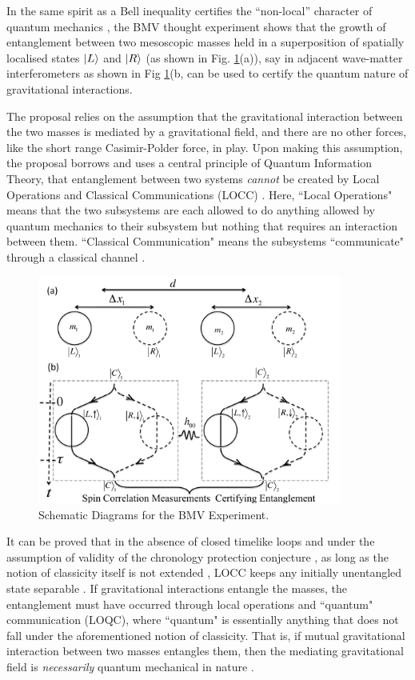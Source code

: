 \documentclass[12pt,a4paper]{report}
\theoremstyle{plain}
\theoremstyle{definition}
\theoremstyle{remark}
\DeclarePairedDelimiter\ket{\lvert}{\rangle}
\begin{document}
In the same spirit as a Bell inequality certifies the ``non-local'' character of quantum mechanics \cite{Bell}, the BMV thought experiment shows that the growth of entanglement between two mesoscopic masses held in a superposition  of spatially localised states $\ket{L}$ and $\ket{R}$ (as shown in Fig. \ref{fig:BMV}(a)\cite{Bose_2017}), say in adjacent wave-matter interferometers as shown in Fig \ref{fig:BMV}(b\cite{Bose_2017}, can be used to certify the quantum nature of gravitational interactions.

The proposal relies on the assumption that the gravitational interaction between the two masses is mediated by a gravitational field, and there are no other forces, like the short range Casimir-Polder force, in play. Upon making this assumption, the proposal borrows and uses a central principle of Quantum Information Theory, that entanglement between two systems \textit{cannot} be created by Local Operations and Classical Communications (LOCC) \cite{RevModPhys.81.865}. Here, ``Local Operations" means that the two subsystems are each allowed to do anything allowed by quantum mechanics to their subsystem but nothing that requires an interaction between them. ``Classical Communication" means the subsystems ``communicate" through a classical channel \cite{Bose_2017}. 

\begin{figure}[ht!]
    \centering
    \includegraphics[width=10cm]{LR_fig.pdf}
    \caption{Schematic Diagrams for the BMV Experiment.}
    \label{fig:BMV}
\end{figure}

It can be proved that in the absence of closed timelike loops \cite{timelike} and under the assumption of validity of the chronology protection conjecture \cite{PhysRevLett.68.267}, as long as the notion of classicity itself is not extended \cite{Hall_2018}, LOCC keeps any initially unentangled state separable \cite{Bose_2017}. If gravitational interactions entangle the masses, the entanglement must have occurred through local operations and ``quantum" communication (LOQC), where ``quantum" is essentially anything that does not fall under the aforementioned notion of classicity. That is, if mutual gravitational interaction between two masses entangles them, then the mediating gravitational field is \textit{necessarily} quantum mechanical in nature \cite{Bose_2017}.
\end{document}
